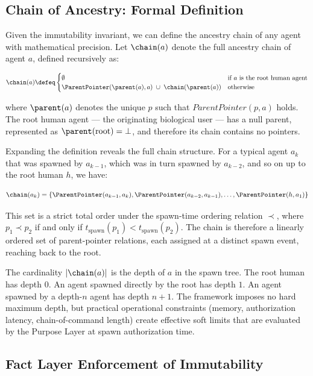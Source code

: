 \subsection{Chain of Ancestry: Formal Definition}

Given the immutability invariant, we can define the ancestry chain of any agent with mathematical precision. Let $\chain(a)$ denote the full ancestry chain of agent $a$, defined recursively as:

\[
\chain(a) \defeq \begin{cases}
\emptyset & \text{if } a \text{ is the root human agent} \\
\ParentPointer(\parent(a), a) \;\cup\; \chain(\parent(a)) & \text{otherwise}
\end{cases}
\]

where $\parent(a)$ denotes the unique $p$ such that $\textit{ParentPointer}(p, a)$ holds. The root human agent — the originating biological user — has a null parent, represented as $\parent(\text{root}) = \bot$, and therefore its chain contains no pointers.

Expanding the definition reveals the full chain structure. For a typical agent $a_k$ that was spawned by $a_{k-1}$, which was in turn spawned by $a_{k-2}$, and so on up to the root human $h$, we have:

\[
\chain(a_k) = \left\{ \ParentPointer(a_{k-1}, a_k), \ParentPointer(a_{k-2}, a_{k-1}), \ldots, \ParentPointer(h, a_1) \right\}
\]

This set is a strict total order under the spawn-time ordering relation $\prec$, where $p_1 \prec p_2$ if and only if $t_{\text{spawn}}(p_1) < t_{\text{spawn}}(p_2)$. The chain is therefore a linearly ordered set of parent-pointer relations, each assigned at a distinct spawn event, reaching back to the root.

The cardinality $|\chain(a)|$ is the depth of $a$ in the spawn tree. The root human has depth $0$. An agent spawned directly by the root has depth $1$. An agent spawned by a depth-$n$ agent has depth $n+1$. The framework imposes no hard maximum depth, but practical operational constraints (memory, authorization latency, chain-of-command length) create effective soft limits that are evaluated by the Purpose Layer at spawn authorization time.

\subsection{Fact Layer Enforcement of Immutability}
\label{sec:fact_layer_enforcement}

